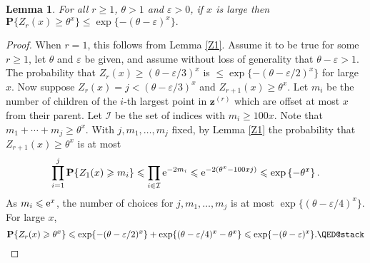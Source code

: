 \documentclass[12pt]{amsart}
\theoremstyle{remark}
\theoremstyle{plain}
\newtheorem{lem}{Lemma}[section]
\numberwithin{equation}{section}
\newcommand{\PPP}{\mathbf P}
\renewcommand{\th}{\ensuremath{\theta}}
\newcommand{\eps}{\ensuremath{\varepsilon}}
\renewcommand{\(}{\left(}
\renewcommand{\)}{\right)}
\newcommand{\zz}{\ensuremath{\mathbf{z}}}
\newcommand{\er}{{\rm e}}  %
\renewcommand{\le}{\leqslant}
\renewcommand{\ge}{\geqslant}
\begin{document}
\begin{lem}\label{Zrklarge}
For all $r\ge 1$, $\theta>1$ and $\eps>0$, if $x$ is large then
$\PPP \{ Z_r(x) \ge \theta^x \} \le \exp \{ - (\theta-\eps)^x \}.$
\end{lem}

\begin{proof}
When $r=1$, this follows from Lemma \ref{Z1}.  Assume it to be true for some $r\ge 1$,
let $\theta$ and $\eps$ be given, and assume without loss of generality that
$\theta-\eps>1$.  The probability that $Z_r(x) \ge (\theta-\eps/3)^x$ is
$\le \exp \{-(\theta-\eps/2)^x\}$ for large $x$.  Now suppose 
$Z_r(x) = j <  (\theta-\eps/3)^x$ and $Z_{r+1}(x) \ge \theta^x$.
Let $m_i$ be the number of children of the $i$-th largest point in
 $\zz^{(r)}$ which are offset at most $x$ from their parent.  Let $\mathcal{I}$
be the set of indices with $m_i \ge 100x$.  
Note  that $m_1+\cdots+m_j\ge \theta^x$.
With $j, m_1, \ldots, m_j$ fixed, by Lemma \ref{Z1}
 the probability that $Z_{r+1}(x) \ge \theta^x$ is at most
$$
\prod_{i=1}^j \PPP \{ Z_1(x) \ge m_i \} \le \prod_{i\in\mathcal{I}} \er^{-2m_i}
\le \er^{-2(\th^x-100xj)} \le \exp \left\{ - \theta^x \right\}.
$$
As $m_i \le \er^x$,
the number of choices for $j,m_1,\ldots,m_j$ is at most
$\exp \{ (\theta-\eps/4)^x \}.$
For large $x$,
\[
\PPP \{ Z_r(x) \ge \theta^x \} \le \exp\{-(\theta-\eps/2)^x\} +
\exp\{  (\theta-\eps/4)^x - \theta^x \} \le \exp \{-(\theta-\eps)^x\}.
\qedhere
\]
\end{proof}
\end{document}

